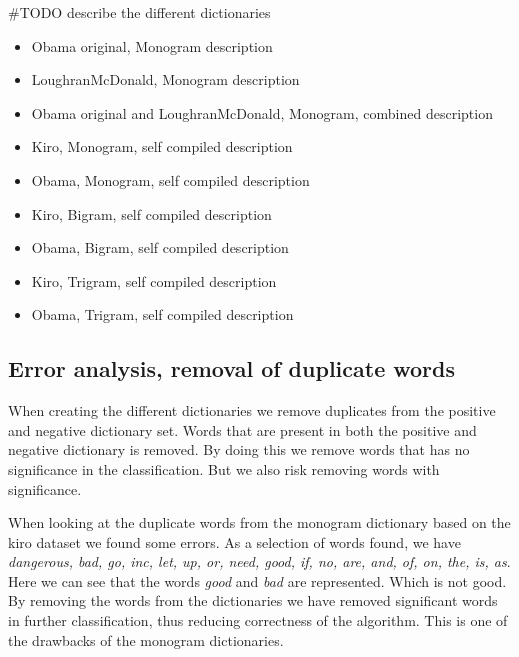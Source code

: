 #TODO describe the different dictionaries\\ 
\begin{itemize}
    \item Obama original, Monogram 
	\subitem description

    \item LoughranMcDonald, Monogram 
	\subitem description

    \item Obama original and LoughranMcDonald, Monogram, combined
	\subitem description

    \item Kiro, Monogram, self compiled 
	\subitem description

    \item Obama, Monogram, self compiled 
	\subitem description

    \item Kiro, Bigram, self compiled 
	\subitem description

    \item Obama, Bigram, self compiled 
	\subitem description

    \item Kiro, Trigram, self compiled 
	\subitem description

    \item Obama, Trigram, self compiled 
	\subitem description
	\label{data:dictionary_list}
\end{itemize}
%

\subsection{Error analysis, removal of duplicate words}
When creating the different dictionaries we remove duplicates from the positive
and negative dictionary set. Words that are present in both the positive and
negative dictionary is removed. By doing this we remove words that has no
significance in the classification. But we also risk removing words with
significance.

When looking at the duplicate words from the monogram dictionary based on the
kiro dataset we found some errors.
As a selection of words found, we have \textit{dangerous, bad, go, inc, let, up, or, need, good, if, no, are, and, of, on, the,
is, as}.
Here we can see that the words \textit{good} and \textit{bad} are represented.
Which is not good. By removing the words from the dictionaries we have removed
significant words in further classification, thus reducing correctness of the
algorithm. This is one of the drawbacks of the monogram dictionaries.

